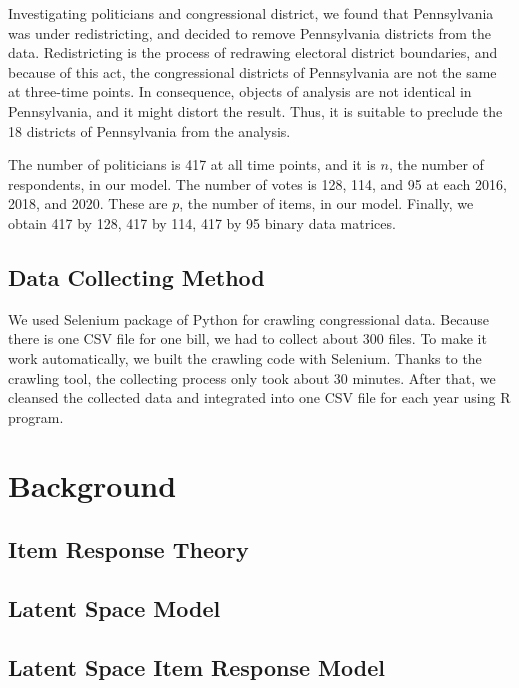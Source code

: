 \documentclass[a4paper, 11pt]{report}
\begin{document}
\quad Investigating politicians and congressional district, we found that Pennsylvania was under redistricting, and decided to remove Pennsylvania districts from the data. Redistricting is the process of redrawing electoral district boundaries, and because of this act, the congressional districts of Pennsylvania are not the same at three-time points. In consequence, objects of analysis are not identical in Pennsylvania, and it might distort the result. Thus, it is suitable to preclude the 18 districts of Pennsylvania from the analysis.

\quad The number of politicians is 417 at all time points, and it is $n$, the number of respondents, in our model. The number of votes is 128, 114, and 95 at each 2016, 2018, and 2020. These are $p$, the number of items, in our model. Finally, we obtain 417 by 128, 417 by 114, 417 by 95 binary data matrices.

\section{Data Collecting Method} \label{crawling}
We used Selenium package of Python for crawling congressional data. Because there is one CSV file for one bill, we had to collect about 300 files. To make it work automatically, we built the crawling code with Selenium. Thanks to the crawling tool, the collecting process only took about 30 minutes. After that, we cleansed the collected data and integrated into one CSV file for each year using R program.


\chapter{Background} \label{Cahpter3}
\section{Item Response Theory}

\section{Latent Space Model}

\section{Latent Space Item Response Model}\label{network}
\end{document}
